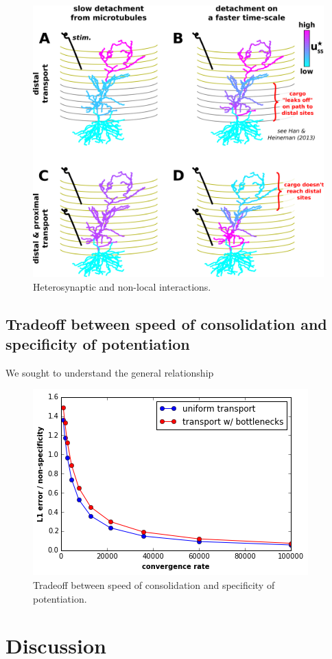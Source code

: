\documentclass[fleqn,10pt]{wlpeerj}
\begin{document}
\begin{figure}[h!]
\begin{center}
\includegraphics[width=0.7\columnwidth]{05_heterosynaptic.png}
\caption{Heterosynaptic and non-local interactions.
}
\end{center}
\end{figure}

\subsection*{Tradeoff between speed of consolidation and specificity of potentiation}

We sought to understand the general relationship

\begin{figure}[h!]
\begin{center}
\includegraphics[width=0.5\columnwidth]{tradeoff.png}
\caption{Tradeoff between speed of consolidation and specificity of potentiation.
}
\end{center}
\end{figure}

\section*{Discussion}
\end{document}
